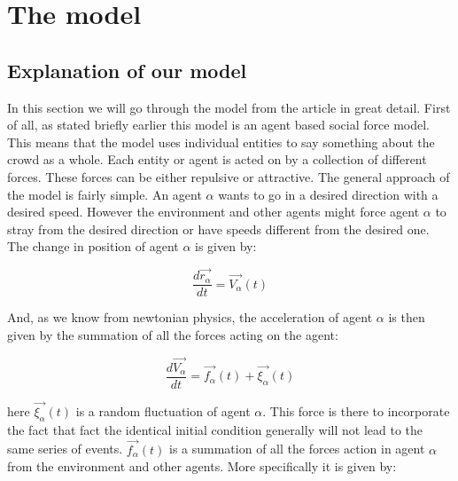 \section{The model}
\label{sec:the-model}


\subsection{Explanation of our model}


In this section we will go through the model from the article \cite{self-org} in great detail. 
First of all,  as stated briefly earlier this model is an agent based social force model. 
This means that the model uses individual entities to say something about the crowd as a whole. 
Each entity or agent is acted on by a collection of different forces. These forces can be
either repulsive or attractive. The general approach of the model is fairly simple. An agent
$\alpha$ wants to go in a desired direction with a desired speed. However the environment 
and other agents might force agent $\alpha$ to stray from the desired direction or have speeds 
different from the desired one. The change in position of agent $\alpha$ is given by:

	\begin{equation}
		\frac{d \vec{r_{\alpha}}}{dt} = \vec{V_{\alpha}} \left( t \right)
	\end{equation}

And, as we know from newtonian physics, the acceleration of agent $\alpha$ is 
then given by the summation of all the forces acting on the agent:

\begin{equation}
    \frac{d \vec{V_{\alpha}}}{dt} = \vec{f_{\alpha}} \left( t \right) + 
    \vec{\xi_{\alpha}}\left( t \right)
\end{equation}

here $\vec{\xi_{\alpha}} \left( t \right)$ is a random fluctuation of agent $\alpha$. This
force is there to incorporate the fact that fact the identical initial condition
generally will not lead to the same series of events. $\vec{f_{\alpha}} \left( t \right)$ 
is a summation of all the forces action in agent $\alpha$ from the environment 
and other agents. More specifically it is given by:

